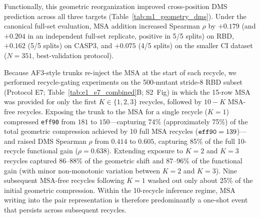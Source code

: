 \documentclass[10pt,a4paper]{article}
\begin{document}
Functionally, this geometric reorganization improved cross-position DMS prediction across all three targets (Table~\ref{tab:m1_geometry_dms}). Under the canonical full-set evaluation, MSA addition increased Spearman $\rho$ by $+0.179$ (and $+0.204$ in an independent full-set replicate, positive in 5/5 splits) on RBD, $+0.162$ (5/5 splits) on CASP3, and $+0.075$ (4/5 splits) on the smaller CI dataset ($N=351$, best-validation protocol).

Because AF3-style trunks re-inject the MSA at the start of each recycle, we performed recycle-gating experiments on the 500-mutant stride-8 RBD subset (Protocol E7; Table~\ref{tab:e1_e7_combined}B; S2~Fig) in which the 15-row MSA was provided for only the first $K \in \{1, 2, 3\}$ recycles, followed by $10 - K$ MSA-free recycles. Exposing the trunk to the MSA for a single recycle ($K=1$) compressed \texttt{eff90} from $181$ to $150$---capturing 74\% (approximately 75\%) of the total geometric compression achieved by 10 full MSA recycles ($\text{\texttt{eff90}} = 139$)---and raised DMS Spearman $\rho$ from $0.414$ to $0.605$, capturing 85\% of the full 10-recycle functional gain ($\rho = 0.638$). Extending exposure to $K=2$ and $K=3$ recycles captured 86--88\% of the geometric shift and 87--96\% of the functional gain (with minor non-monotonic variation between $K=2$ and $K=3$). Nine subsequent MSA-free recycles following $K=1$ washed out only about 25\% of the initial geometric compression. Within the 10-recycle inference regime, MSA writing into the pair representation is therefore predominantly a one-shot event that persists across subsequent recycles.
\end{document}
